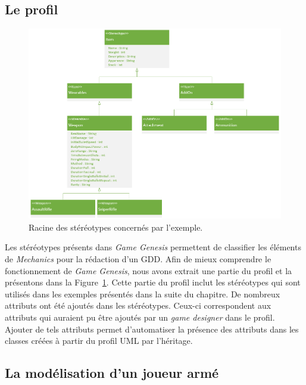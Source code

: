 \subsection{Le profil}

\begin{figure}
    \centering
    \includegraphics[width=14cm]{10_img/chap6/root(stereotypes).PNG} 
    \caption{Racine des stéréotypes concernés par l'exemple.}
    \label{fig.racine_stereo}
\end{figure}

Les stéréotypes présents dans \emph{Game Genesis} permettent de classifier les \'el\'ements de \emph{Mechanics} pour la rédaction d'un GDD.
Afin de mieux comprendre le fonctionnement de \emph{Game Genesis}, nous avons extrait une partie du profil et la pr\'esentons dans la Figure~\ref{fig.racine_stereo}.
Cette partie du profil inclut les stéréotypes qui sont utilisés dans les exemples présentés dans la suite du chapitre.
De nombreux attributs ont été ajoutés dans les stéréotypes. 
Ceux-ci correspondent aux attributs qui auraient pu être ajoutés par un \emph{game designer} dans le profil.
Ajouter de tels attributs permet d'automatiser la présence des attributs dans les classes créées à partir du profil UML par l'héritage.

\subsection{La modélisation d'un joueur armé}

